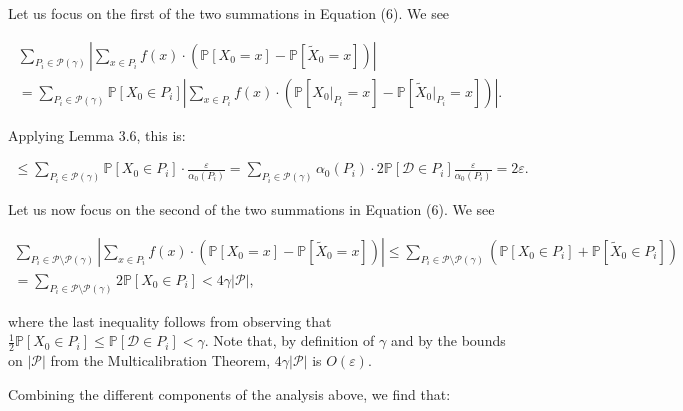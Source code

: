 \documentclass[10pt,a4paper]{article}
\begin{document}
Let us focus on the first of the two summations in Equation (6). We see\par


\[\begin{gathered}
\displaystyle\sum_{P_{i}\in\mathcal{P}(\gamma)}\left|\sum_{x\in P_{i}}f(x)\cdot\left(\mathbb{P}[X_{0}=x]-\mathbb{P}[\widetilde{X}_{0}=x]\right)\right| \\
\displaystyle=\sum_{P_{i}\in\mathcal{P}(\gamma)}\mathbb{P}[X_{0}\in P_{i}]\left|\sum_{x\in P_{i}}f(x)\cdot\left(\mathbb{P}[X_{0}|_{P_{i}}=x]-\mathbb{P}[\widetilde{X}_{0}|_{P_{i}}=x]\right)\right|.
\end{gathered}\]


Applying Lemma 3.6, this is:\par


\[\begin{gathered}
\leq\sum_{P_{i}\in\mathcal{P}(\gamma)}\mathbb{P}[X_{0}\in P_{i}]\cdot\frac{\varepsilon}{\alpha_{0}(P_{i})}=\sum_{P_{i}\in\mathcal{P}(\gamma)}\alpha_{0}(P_{i})\cdot 2\mathbb{P}[\mathcal{D}\in P_{i}]\frac{\varepsilon}{\alpha_{0}(P_{i})}=2\varepsilon.
\end{gathered}\]




Let us now focus on the second of the two summations in Equation (6). We see\par


\[\begin{gathered}
\displaystyle\sum_{P_{i}\in\mathcal{P}\setminus\mathcal{P}(\gamma)}\left|\sum_{x\in P_{i}}f(x)\cdot\left(\mathbb{P}[X_{0}=x]-\mathbb{P}[\widetilde{X}_{0}=x]\right)\right|\leq\sum_{P_{i}\in\mathcal{P}\setminus\mathcal{P}(\gamma)}\left(\mathbb{P}[X_{0}\in P_{i}]+\mathbb{P}[\widetilde{X}_{0}\in P_{i}]\right) \\
\displaystyle=\sum_{P_{i}\in\mathcal{P}\setminus\mathcal{P}(\gamma)}2\mathbb{P}[X_{0}\in P_{i}]<4\gamma|\mathcal{P}|,
\end{gathered}\]


where the last inequality follows from observing that $\frac{1}{2}\mathbb{P}[X_{0}\in P_{i}]\leq\mathbb{P}[\mathcal{D}\in P_{i}]<\gamma$. Note that, by definition of $\gamma$ and by the bounds on $|\mathcal{P}|$ from the Multicalibration Theorem, $4\gamma|\mathcal{P}|$ is $O(\varepsilon)$.\par




Combining the different components of the analysis above, we find that:\par
\end{document}
